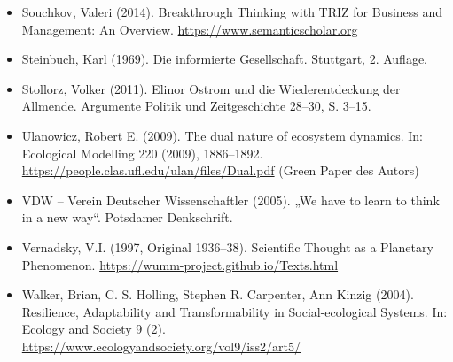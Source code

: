 \documentclass[11pt,a4paper]{article}
\begin{document}
\begin{itemize}
\item Souchkov, Valeri (2014). Breakthrough Thinking with TRIZ for Business
  and Management: An Overview. \url{https://www.semanticscholar.org}
\item Steinbuch, Karl (1969). Die informierte Gesellschaft.  Stuttgart,
  2. Auflage. 
\item Stollorz, Volker (2011). Elinor Ostrom und die Wiederentdeckung der
  Allmende. Argumente Politik und Zeitgeschichte 28--30, S. 3--15. 
\item Ulanowicz, Robert E. (2009). The dual nature of ecosystem dynamics.
  In: Ecological Modelling 220 (2009), 1886–1892.\\
  \url{https://people.clas.ufl.edu/ulan/files/Dual.pdf} (Green Paper des
  Autors) 
\item VDW -- Verein Deutscher Wissenschaftler (2005). „We have to learn to
  think in a new way“. Potsdamer Denkschrift.
\item Vernadsky, V.I. (1997, Original 1936--38). Scientific Thought as a
  Planetary Phenomenon. \url{https://wumm-project.github.io/Texts.html}
\item Walker, Brian, C. S. Holling, Stephen R. Carpenter, Ann Kinzig (2004).
  Resilience, Adaptability and Transformability in Social-ecological Systems. 
  In: Ecology and Society 9 (2).
  \url{https://www.ecologyandsociety.org/vol9/iss2/art5/}
\end{itemize}
\end{document}
